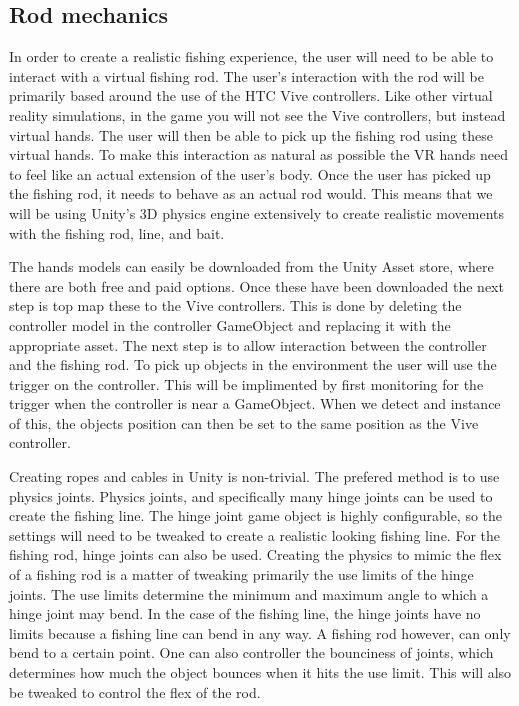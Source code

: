 \documentclass[10pt,journal,compsoc,onecolumn, draftclsnofoot]{IEEEtran}
\begin{document}
\subsection{Rod mechanics}
In order to create a realistic fishing experience, the user will need to be able to interact with a virtual fishing rod.
The user's interaction with the rod will be primarily based around the use of the HTC Vive controllers.
Like other virtual reality simulations, in the game you will not see the Vive controllers, but instead virtual hands.
The user will then be able to pick up the fishing rod using these virtual hands.
To make this interaction as natural as possible the VR hands need to feel like an actual extension of the user's body.
Once the user has picked up the fishing rod, it needs to behave as an actual rod would.
This means that we will be using Unity's 3D physics engine extensively to create realistic movements with the fishing rod, line, and bait.

The hands models can easily be downloaded from the Unity Asset store, where there are both free and paid options.
Once these have been downloaded the next step is top map these to the Vive controllers.
This is done by deleting the controller model in the controller GameObject and replacing it with the appropriate asset.
The next step is to allow interaction between the controller and the fishing rod.
To pick up objects in the environment the user will use the trigger on the controller.
This will be implimented by first monitoring for the trigger when the controller is near a GameObject.
When we detect and instance of this, the objects position can then be set to the same position as the Vive controller.

Creating ropes and cables in Unity is non-trivial.
The prefered method is to use physics joints.
Physics joints, and specifically many hinge joints can be used to create the fishing line.
The hinge joint game object is highly configurable, so the settings will need to be tweaked to create a realistic looking fishing line.
For the fishing rod, hinge joints can also be used.
Creating the physics to mimic the flex of a fishing rod is a matter of tweaking primarily the use limits of the hinge joints.
The use limits determine the minimum and maximum angle to which a hinge joint may bend.
In the case of the fishing line, the hinge joints have no limits because a fishing line can bend in any way.
A fishing rod however, can only bend to a certain point.
One can also controller the bounciness of joints, which determines how much the object bounces when it hits the use limit.
This will also be tweaked to control the flex of the rod.



\end{document}

